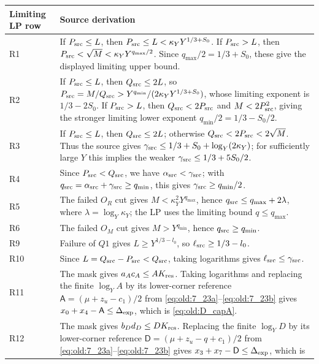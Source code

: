 \begin{longtable}{@{}p{}p{}@{}}
\toprule
Limiting LP row & Source derivation \\
\midrule
\endhead
R1 & If \(P_{\rm src}\le L\), then \(P_{\rm src}\le L<\kappa_YY^{1/3+S_0}\).
If \(P_{\rm src}>L\), then \(P_{\rm src}<\sqrt M<\kappa_YY^{q_{\max}/2}\).
Since \(q_{\max}/2=1/3+S_0\), these give the displayed limiting upper bound. \\
R2 & If \(P_{\rm src}\le L\), then \(Q_{\rm src}\le2L\), so
\(P_{\rm src}=M/Q_{\rm src}>Y^{q_{\min}}/(2\kappa_YY^{1/3+S_0})\),
whose limiting exponent is \(1/3-2S_0\). If \(P_{\rm src}>L\), then
\(Q_{\rm src}<2P_{\rm src}\) and \(M<2P_{\rm src}^2\), giving the
stronger limiting lower exponent \(q_{\min}/2=1/3-S_0/2\). \\
R3 & If \(P_{\rm src}\le L\), then \(Q_{\rm src}\le2L\); otherwise
\(Q_{\rm src}<2P_{\rm src}<2\sqrt M\). Thus the source gives
\(\gamma_{\rm src}\le1/3+S_0+\log_Y(2\kappa_Y)\); for sufficiently large \(Y\)
this implies the weaker \(\gamma_{\rm src}\le1/3+5S_0/2\). \\
R4 & Since \(P_{\rm src}<Q_{\rm src}\), we have
\(\alpha_{\rm src}<\gamma_{\rm src}\); with
\(q_{\rm src}=\alpha_{\rm src}+\gamma_{\rm src}\ge q_{\min}\), this gives
\(\gamma_{\rm src}\ge q_{\min}/2\). \\
R5 & The failed \(O_R\) cut gives \(M<\kappa_Y^2Y^{q_{\max}}\), hence
\(q_{\rm src}\le q_{\max}+2\lambda\), where \(\lambda=\log_Y\kappa_Y\);
the LP uses the limiting bound \(q\le q_{\max}\). \\
R6 & The failed \(O_M\) cut gives \(M>Y^{q_{\min}}\), hence
\(q_{\rm src}\ge q_{\min}\). \\
R9 & Failure of \(Q1\) gives \(L\ge Y^{1/3-l_0}\), so
\(\ell_{\rm src}\ge1/3-l_0\). \\
R10 & Since \(L=Q_{\rm src}-P_{\rm src}<Q_{\rm src}\), taking logarithms gives
\(\ell_{\rm src}\le\gamma_{\rm src}\). \\
R11 & The mask gives \(a_Ac_A\le A K_{\rm res}\). Taking logarithms
and replacing the finite \(\log_Y A\) by its lower-corner reference
\(\mathsf A=(\mu+z_u-c_1)/2\) from \eqref{eq:old:7_23a}--\eqref{eq:old:7_23b}
gives \(x_0+x_4-\mathsf A\le\Delta_{\rm exp}\), which is
\eqref{eq:old:D_capA}. \\
R12 & The mask gives \(b_Dd_D\le D K_{\rm res}\). Replacing the finite
\(\log_YD\) by its lower-corner reference
\(\mathsf D=(\mu+z_u-q+c_1)/2\) from \eqref{eq:old:7_23a}--\eqref{eq:old:7_23b}
gives \(x_3+x_7-\mathsf D\le\Delta_{\rm exp}\), which is

\end{longtable}
